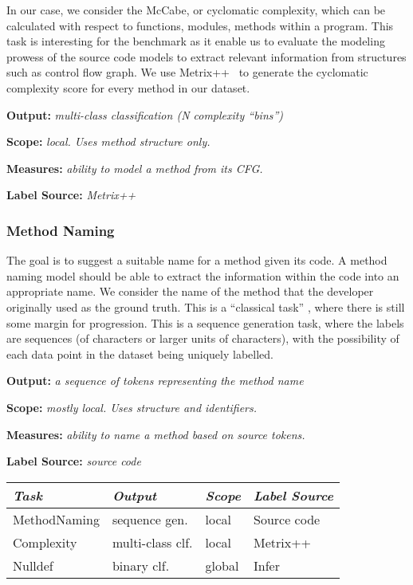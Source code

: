 \documentclass[sigplan,review,anonymous]{acmart}\settopmatter{printfolios=true,printccs=false,printacmref=false}
\begin{document}
In our case, we consider the McCabe, or cyclomatic complexity, which can be calculated with respect to functions, modules, methods within a program. This task is interesting for the benchmark as it enable us to evaluate the modeling prowess of the source code models to extract relevant information from structures such as control flow graph. We use Metrix++~\citep{metrixplusplus} to generate the cyclomatic complexity score for every method in our dataset. \newline

\noindent
\textbf{Output:} \textit{multi-class classification (N complexity “bins”)}

\noindent
\textbf{Scope:} \textit{local. Uses method structure only.}

\noindent
\textbf{Measures:} \textit{ability to model a method from its CFG.}

\noindent
\textbf{Label Source:} \textit{Metrix++}

\subsubsection{Method Naming}
The goal is to suggest a suitable name for a method given its code. A method naming model should be able to extract the information  within the code into an appropriate name. We consider the name of the method that the developer originally used as the ground truth. This is a “classical task” \cite{allamanis2015suggesting,DBLP:journals/corr/AllamanisPS16}, where there is still some margin for progression. This is a sequence generation task, where the labels are sequences (of characters or larger units of characters), with the possibility of each data point in the dataset being uniquely labelled. \newline 

\noindent
\textbf{Output:} \textit{a sequence of tokens representing the method name}

\noindent
\textbf{Scope:} \textit{mostly local. Uses structure and identifiers.}

\noindent
\textbf{Measures:} \textit{ability to name a method based on source tokens.}

\noindent
\textbf{Label Source:} \textit{source code}


\begin{table}[t]
\centering
\begin{tabular}{llll}
\toprule
\textit{\textbf{Task}}& \textit{\textbf{Output}} &\textit{\textbf{Scope}}  & \textit{\textbf{Label Source}}   \\ \midrule
MethodNaming & sequence gen.         & local          & Source code             \\
Complexity   & multi-class clf.        & local          & Metrix++                \\
Nulldef      & binary clf.        & global         & Infer                   \\ \bottomrule
\end{tabular}
\end{table}
\end{document}
